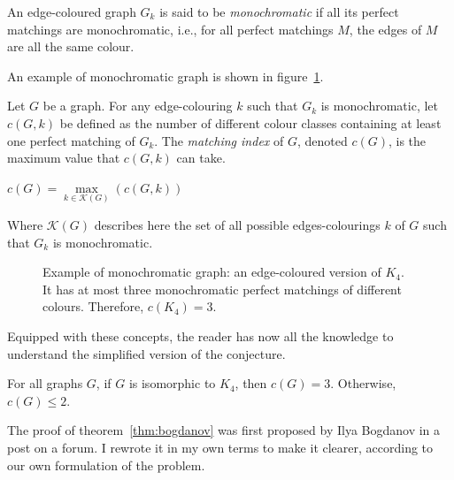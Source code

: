 \begin{definition}
    \label{def:monochromatic_graph}
    An edge-coloured graph $G_k$ is said to be \textit{monochromatic} if all its perfect matchings are monochromatic, i.e., for all perfect matchings $M$, the edges of $M$ are all the same colour.
\end{definition}

An example of monochromatic graph is shown in figure~\ref{fig:k4_pm}.

\begin{definition}
    \label{def:matching_index}
    Let $G$ be a graph.
    For any edge-colouring $k$ such that $G_k$ is monochromatic, let $c(G, k)$ be defined as the number of different colour classes containing at least one perfect matching of $G_k$.
    The \textit{matching index} of $G$, denoted $c(G)$, is the maximum value that $c(G, k)$ can take.
    \begin{center}
        $c(G) = \max\limits_{k \in \mathcal{K}(G)}(c(G, k))$
    \end{center}
    Where $\mathcal{K}(G)$ describes here the set of all possible edges-colourings $k$ of $G$ such that $G_{k}$ is monochromatic.
\end{definition}

\begin{figure}[H]
    \caption{Example of monochromatic graph: an edge-coloured version of $K_4$. It has at most three monochromatic perfect matchings of different colours.
        Therefore, $c(K_4) = 3$.}
    \label{fig:k4_pm}
\end{figure}

Equipped with these concepts, the reader has now all the knowledge to understand the simplified version of the conjecture.

\begin{theorem}
    \label{thm:bogdanov}
    For all graphs $G$, if $G$ is isomorphic to $K_4$, then $c(G) = 3$.
    Otherwise, $c(G) \leq 2$.
\end{theorem}

The proof of theorem~\ref{thm:bogdanov} was first proposed by Ilya Bogdanov in a post on a forum. \cite{bogdanov}
I rewrote it in my own terms to make it clearer, according to our own formulation of the problem.

